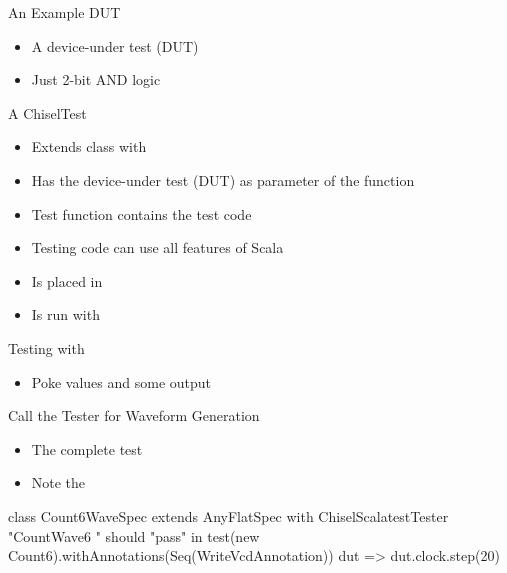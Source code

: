 \begin{frame}[fragile]{An Example DUT}
\begin{itemize}
\item A device-under test (DUT)
\item Just 2-bit AND logic
\end{itemize}
\end{frame}

\begin{frame}[fragile]{A ChiselTest}
\begin{itemize}
\item Extends class  with 
\item Has the device-under test (DUT) as parameter of the  function
\item Test function contains the test code
\item Testing code can use all features of Scala
\item Is placed in 
\item Is run with 
\end{itemize}
\end{frame}


\begin{frame}[fragile]{Testing with }
\begin{itemize}
\item Poke values and  some output
\end{itemize}
\end{frame}

\begin{frame}[fragile]{Call the Tester for Waveform Generation}
\begin{itemize}
\item The complete test
\item Note the 
\end{itemize}
\begin{chisel}
class Count6WaveSpec extends AnyFlatSpec with ChiselScalatestTester {
  "CountWave6 " should "pass" in {
    test(new Count6).withAnnotations(Seq(WriteVcdAnnotation)) { dut =>
      dut.clock.step(20)
    }
  }
}
\end{chisel}
\end{frame}

